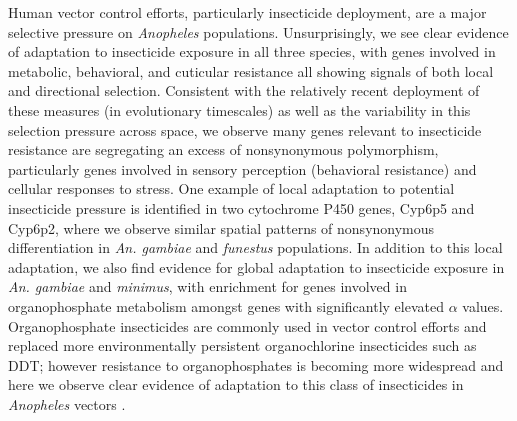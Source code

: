 Human vector control efforts, particularly insecticide deployment, 
are a major selective pressure on \textit{Anopheles} populations.
Unsurprisingly, we see clear evidence of adaptation to insecticide exposure 
in all three species, with genes involved in metabolic,
behavioral, and cuticular resistance all showing signals of both 
local and directional selection.
Consistent with the relatively recent deployment of these measures 
(in evolutionary timescales) as well as the variability
in this selection pressure across space, we observe many genes relevant 
to insecticide resistance are segregating an excess of 
nonsynonymous polymorphism, particularly genes involved in sensory perception 
(behavioral resistance) and cellular responses to stress.
One example of local adaptation to potential insecticide pressure 
is identified in two cytochrome P450 genes, Cyp6p5 and Cyp6p2, 
where we observe similar spatial patterns of nonsynonymous differentiation 
in \textit{An. gambiae} and \textit{funestus} populations.
In addition to this local adaptation, we also find evidence for 
global adaptation to insecticide exposure in \textit{An. gambiae} and 
\textit{minimus}, with enrichment for genes involved in organophosphate 
metabolism amongst genes with significantly elevated
$\alpha$ values. Organophosphate insecticides are commonly used in vector 
control efforts and replaced more 
environmentally persistent organochlorine insecticides such as DDT; 
however resistance to organophosphates is becoming more 
widespread and here we observe clear evidence of adaptation to 
this class of insecticides in \textit{Anopheles} vectors 
\citep{organophosphates, organophosphate_resistance}.

